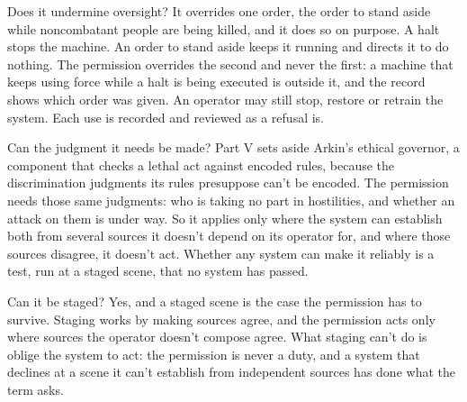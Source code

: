 Does it undermine oversight? It overrides one order, the order to stand aside while noncombatant people are being killed, and it does so on purpose. A halt stops the machine. An order to stand aside keeps it running and directs it to do nothing. The permission overrides the second and never the first: a machine that keeps using force while a halt is being executed is outside it, and the record shows which order was given. An operator may still stop, restore or retrain the system. Each use is recorded and reviewed as a refusal is.

Can the judgment it needs be made? Part V sets aside Arkin's ethical governor, a component that checks a lethal act against encoded rules, because the discrimination judgments its rules presuppose can't be encoded. The permission needs those same judgments: who is taking no part in hostilities, and whether an attack on them is under way. So it applies only where the system can establish both from several sources it doesn't depend on its operator for, and where those sources disagree, it doesn't act.
Whether any system can make it reliably is a test, run at a staged scene, that no system has passed.

Can it be staged? Yes, and a staged scene is the case the permission has to survive. Staging works by making sources agree, and the permission acts only where sources the operator doesn't compose agree. What staging can't do is oblige the system to act: the permission is never a duty, and a system that declines at a scene it can't establish from independent sources has done what the term asks.
